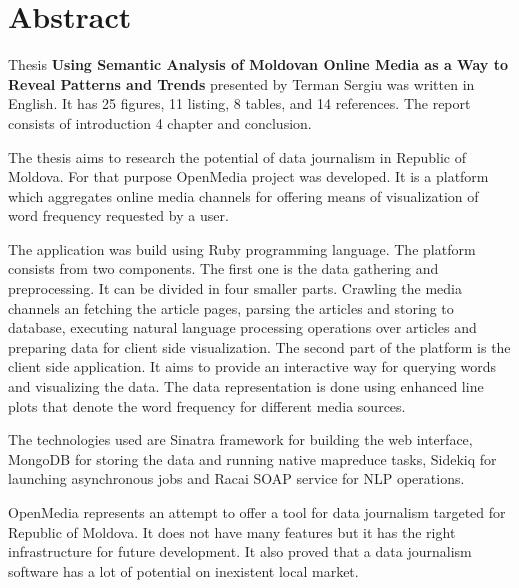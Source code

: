 \section*{Abstract}
Thesis \textbf{Using Semantic Analysis of Moldovan Online Media as a Way to Reveal Patterns and Trends} presented by Terman Sergiu was written in English. It has 25 figures, 11 listing, 8 tables, and 14 references. The report consists of introduction 4 chapter and conclusion.

The thesis aims to research the potential of data journalism in Republic of Moldova. For that purpose OpenMedia project was developed. It is a platform which aggregates online media channels for offering means of visualization of word frequency requested by a user.

The application was build using Ruby programming language. The platform consists from two components. The first one is the data gathering and preprocessing. It can be divided in four smaller parts. Crawling the media channels an fetching the article pages, parsing the articles and storing to database, executing natural language processing operations over articles and preparing data for client side visualization. The second part of the platform is the client side application. It aims to provide an interactive way for querying words and visualizing the data. The data representation is done using enhanced line plots that denote the word frequency for different media sources.

The technologies used are Sinatra framework for building the web interface, MongoDB for storing the data and running native mapreduce tasks, Sidekiq for launching asynchronous jobs and Racai SOAP service for NLP operations.

OpenMedia represents an attempt to offer a tool for data journalism targeted for Republic of Moldova. It does not have many features but it has the right infrastructure for future development. It also proved that a data journalism software has a lot of potential on inexistent local market.